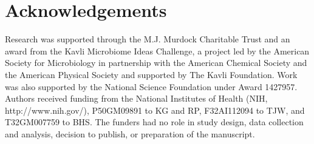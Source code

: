 \section*{Acknowledgements}

Research was supported through the M.J. Murdock Charitable Trust and an award from the Kavli Microbiome Ideas Challenge, a project led by the American Society for Microbiology in partnership with the American Chemical Society and the American Physical Society and supported by The Kavli Foundation. Work was also supported by the National Science Foundation under Award 1427957. Authors received funding from the National Institutes of Health (NIH, http://www.nih.gov/), P50GM09891 to KG and RP, F32AI112094 to TJW, and T32GM007759 to BHS. The funders had no role in study design, data collection and analysis, decision to publish, or preparation of the manuscript.

